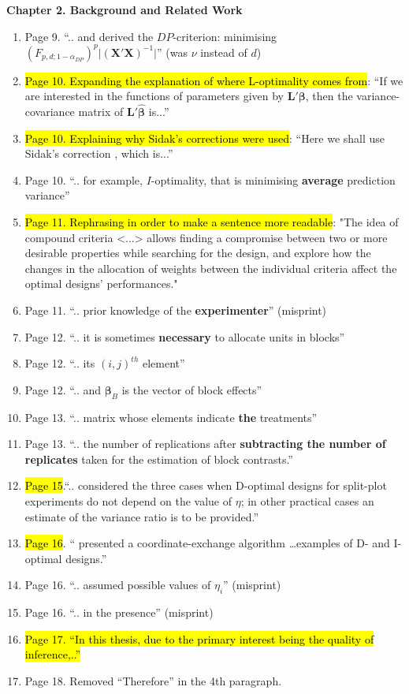 \documentclass[11pt,a4paper,oneside]{article}
\begin{document}
\textbf{Chapter 2. Background and Related Work}
\begin{enumerate}
\item Page 9. ``.. and derived the $DP$-criterion: minimising $(F_{p,d;1-\alpha_{DP}})^{p}\vert(\bm{X'}\bm{X})^{-1}\vert$'' (was $\nu$ instead of $d$)
\item \hl{Page 10. Expanding the explanation of where L-optimality comes from}: ``If we are interested in the functions of parameters given by $\bm{L}'\bm{\beta}$, then the variance-covariance matrix of $\bm{L}'\bm{\hat{\beta}}$ is...''
\item \hl{Page 10. Explaining why Sidak's corrections were used}: ``Here we shall use Sidak's correction \citep{vsidak1967rectangular}, which is...''
\item Page 10. ``.. for example, $I$-optimality, that is minimising \textbf{average} prediction variance''
\item \hl{Page 11. Rephrasing in order to make a sentence more readable}: "The idea of compound criteria <...>  allows finding a compromise between two or more desirable properties while searching for the design, and explore how the changes in the allocation of weights between the individual criteria affect the optimal designs' performances."
\item Page 11. ``.. prior knowledge of the \textbf{experimenter}'' (misprint)
\item Page 12. ``.. it is sometimes \textbf{necessary} to allocate units in blocks''
\item Page 12. ``.. its $(i,j)^{th}$ element''
\item Page 12. ``.. and $\bm{\beta}_B$ is the vector of block effects''
\item Page 13. ``.. matrix whose elements indicate \textbf{the} treatments''
\item Page 13. ``.. the number of replications after \textbf{subtracting the number of replicates} taken for the estimation of block contrasts.''
\item  \hl{Page 15}.``.. \cite{Goos2001Doptimal} considered the three cases when D-optimal designs for split-plot experiments do not depend on the value of $\eta$; in other practical cases an estimate of the variance ratio is to be provided.'' 
\item  \hl{Page 16}. ``\cite{Arnouts2012staggered} presented a coordinate-exchange algorithm \ldots examples of D- and I-optimal designs.''
\item Page 16. ``.. assumed possible values of $\eta_i$'' (misprint)
\item Page 16. ``.. in the presence'' (misprint)
\item \hl{Page 17. ``In this thesis, due to the primary interest being the quality of inference,..''}
\item Page 18. Removed ``Therefore'' in the 4th paragraph.
\end{enumerate}
\end{document}
